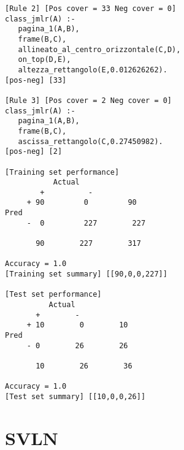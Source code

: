 \begin{multicols}{2}
\begin{verbatim}
[Rule 2] [Pos cover = 33 Neg cover = 0]
class_jmlr(A) :-
   pagina_1(A,B),
   frame(B,C),
   allineato_al_centro_orizzontale(C,D),
   on_top(D,E),
   altezza_rettangolo(E,0.012626262).
[pos-neg] [33]

[Rule 3] [Pos cover = 2 Neg cover = 0]
class_jmlr(A) :-
   pagina_1(A,B),
   frame(B,C),
   ascissa_rettangolo(C,0.27450982).
[pos-neg] [2]

[Training set performance]
           Actual
        +          -  
     + 90         0         90 
Pred 
     -  0         227        227 

       90        227        317 

Accuracy = 1.0
[Training set summary] [[90,0,0,227]]

[Test set performance]
          Actual
       +        - 
     + 10        0        10 
Pred 
     - 0        26        26 

       10        26        36 

Accuracy = 1.0
[Test set summary] [[10,0,0,26]]
	\end{verbatim}
\end{multicols}

\section{SVLN}
